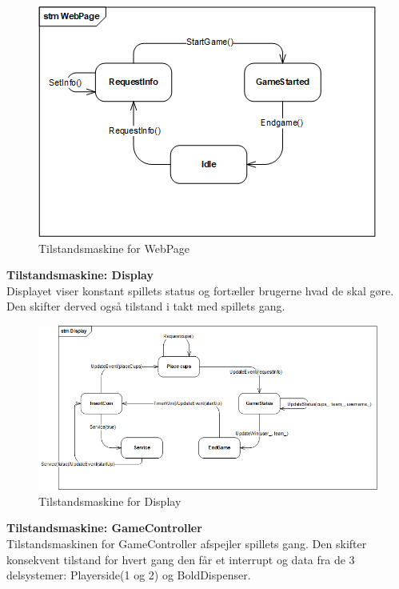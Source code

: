\documentclass[Arkitektur/System_main.tex]{subfiles}
\begin{document}
\begin{figure}[H]
    \centering
    \includegraphics[width=\textwidth]{Arkitektur/Softwarearkitektur/Applikationsmodel/RPi/graphics_RPi/stm_web.png}
    \caption{Tilstandsmaskine for WebPage}
    \label{fig:stm_Web}
\end{figure}

\textbf{Tilstandsmaskine: Display}\\
Displayet viser konstant spillets status og fortæller brugerne hvad de skal gøre. Den skifter derved også tilstand i takt med spillets gang. 

\begin{figure}[H]
    \centering
    \includegraphics[width=\textwidth]{Arkitektur/Softwarearkitektur/Applikationsmodel/RPi/graphics_RPi/stm_disp.png}
    \caption{Tilstandsmaskine for Display}
    \label{fig:stm_disp}
\end{figure}

\textbf{Tilstandsmaskine: GameController}\\
Tilstandsmaskinen for GameController afspejler spillets gang. Den skifter konsekvent tilstand for hvert gang den får et interrupt og data fra de 3 delsystemer: Playerside(1 og 2) og BoldDispenser. 
\end{document}
